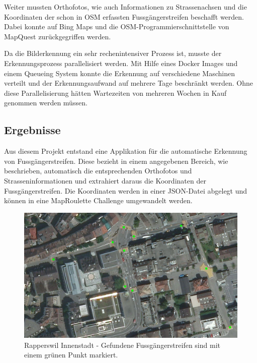 Weiter mussten Orthofotos, wie auch Informationen zu Strassenachsen und die Koordinaten der schon in OSM erfassten Fussgängerstreifen beschafft werden. Dabei konnte auf Bing Maps und die OSM-Programmierschnittstelle von MapQuest zurückgegriffen werden.

Da die Bilderkennung ein sehr rechenintensiver Prozess ist, musste der Erkennungsprozess parallelisiert werden. Mit Hilfe eines Docker Images und einem Queueing System konnte die Erkennung auf verschiedene Maschinen verteilt und der Erkennungsaufwand auf mehrere Tage beschränkt werden. Ohne diese Parallelisierung hätten Wartezeiten von mehreren Wochen in Kauf genommen werden müssen.


\subsection*{Ergebnisse}
Aus diesem Projekt entstand eine Applikation für die automatische Erkennung von Fussgängerstreifen. Diese bezieht in einem angegebenen Bereich, wie beschrieben, automatisch die entsprechenden Orthofotos und Strasseninformationen und extrahiert daraus die Koordinaten der Fussgängerstreifen. Die Koordinaten werden in einer JSON-Datei abgelegt und können in eine MapRoulette Challenge umgewandelt werden. 
\\
\begin{figure}[H]
	\centering
	\includegraphics[width=\textwidth -10mm]{images/boxsave_rappi.png}
	\caption[Überblick]{Rapperswil Innenstadt - Gefundene Fussgängerstreifen sind mit einem grünen Punkt markiert.}
\end{figure}

